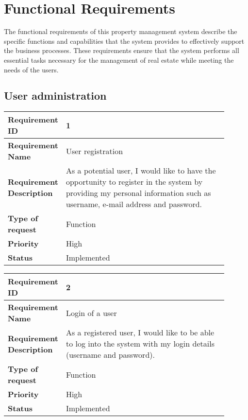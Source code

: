 \section{Functional Requirements}
The functional requirements of this property management system describe the specific functions and capabilities that the system provides to effectively support the business processes. These requirements ensure that the system performs all essential tasks necessary for the management of real estate while meeting the needs of the users. \\

\subsection{User administration}
\begin{table}[htbp]
  \centering
\begin{tabular}{|m{0.15\linewidth}|m{0.75\linewidth}|}
    \hline
    \textbf{Requirement ID} & 1 \\
    \hline
    \textbf{Requirement Name} & User registration \\
    \hline
    \textbf{Requirement Description} & As a potential user, I would like to have the opportunity to register in the system by providing my personal information such as username, e-mail address and password. \\
    \hline
    \textbf{Type of request} & Function \\
    \hline
    \textbf{Priority} & High \\
    \hline
    \textbf{Status} & Implemented \\
    \hline
  \end{tabular}
\end{table}

\begin{table}[htbp]
  \centering
\begin{tabular}{|m{0.15\linewidth}|m{0.75\linewidth}|}
    \hline
    \textbf{Requirement ID} & 2 \\
    \hline
    \textbf{Requirement Name} & Login of a user \\
    \hline
    \textbf{Requirement Description} & As a registered user, I would like to be able to log into the system with my login details (username and password). \\
    \hline
    \textbf{Type of request} & Function \\
    \hline
    \textbf{Priority} & High \\
    \hline
    \textbf{Status} & Implemented \\
    \hline
  \end{tabular}
\end{table}
  
